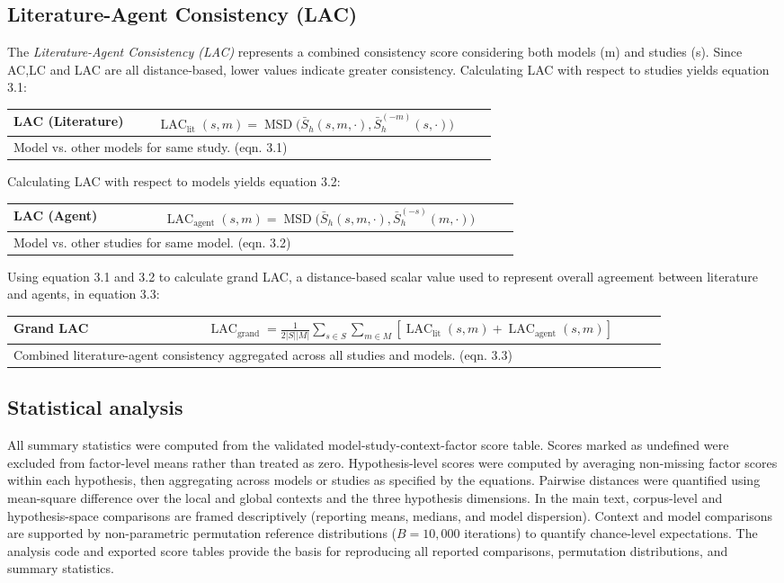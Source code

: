 \documentclass[12pt]{article}
\renewcommand{\arraystretch}{1.06}
\newcommand{\EquationBox}[3]{%
  \begin{center}
  \begingroup
  \small
  \setlength{\tabcolsep}{6pt}%
  \renewcommand{\arraystretch}{1.18}%
  \begin{tabular}{|p{0.27\linewidth}|p{0.64\linewidth}|}
  \hline
  \textbf{#1} & #2 \\
  \hline
  \multicolumn{2}{|p{0.94\linewidth}|}{#3} \\
  \hline
  \end{tabular}
  \endgroup
  \end{center}
}
\begin{document}
\subsection{Literature-Agent Consistency (LAC)}\label{literature-agent-consistency-lac}

The \emph{Literature-Agent Consistency (LAC)} represents a combined consistency score considering both models (m) and studies (s). Since AC,LC and LAC are all distance-based, lower values indicate greater consistency. Calculating LAC with respect to studies yields equation 3.1:
\EquationBox{LAC (Literature)}{\(\displaystyle \operatorname{LAC}_{\mathrm{lit}}(s,m)=\operatorname{MSD}\bigl(\bar{S}_h(s,m,\cdot),\bar{S}_h^{(-m)}(s,\cdot)\bigr)\)}{Model vs. other models for same study. (eqn. 3.1)}
Calculating LAC with respect to models yields equation 3.2:
\EquationBox{LAC (Agent)}{\(\displaystyle \operatorname{LAC}_{\mathrm{agent}}(s,m)=\operatorname{MSD}\bigl(\bar{S}_h(s,m,\cdot),\bar{S}_h^{(-s)}(m,\cdot)\bigr)\)}{Model vs. other studies for same model. (eqn. 3.2)}
Using equation 3.1 and 3.2 to calculate grand LAC, a distance-based scalar value used to represent overall agreement between literature and agents, in equation 3.3:
\EquationBox{Grand LAC}{\(\displaystyle \operatorname{LAC}_{\mathrm{grand}}=\frac{1}{2|S||M|}\sum_{s\in S}\sum_{m\in M}\left[\operatorname{LAC}_{\mathrm{lit}}(s,m)+\operatorname{LAC}_{\mathrm{agent}}(s,m)\right]\)}{Combined literature-agent consistency aggregated across all studies and models. (eqn. 3.3)}


\subsection{Statistical analysis}\label{statistical-analysis}
All summary statistics were computed from the validated model-study-context-factor score table. Scores marked as undefined were excluded from factor-level means rather than treated as zero. Hypothesis-level scores were computed by averaging non-missing factor scores within each hypothesis, then aggregating across models or studies as specified by the equations. Pairwise distances were quantified using mean-square difference over the local and global contexts and the three hypothesis dimensions. In the main text, corpus-level and hypothesis-space comparisons are framed descriptively (reporting means, medians, and model dispersion). Context and model comparisons are supported by non-parametric permutation reference distributions ($B=10{,}000$ iterations) to quantify chance-level expectations. The analysis code and exported score tables provide the basis for reproducing all reported comparisons, permutation distributions, and summary statistics.
\end{document}
